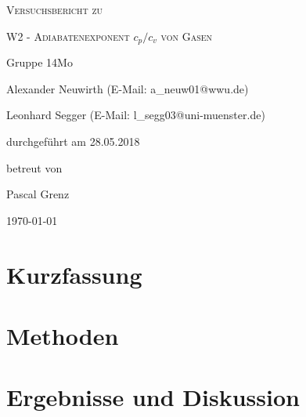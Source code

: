 \documentclass[
	a4paper,
	12pt,
	pagesize,
	ngerman
]{scrartcl}
\begin{document}
	
	\begin{titlepage}
		\centering
		{\scshape\LARGE Versuchsbericht zu \par}
		\vspace{1cm}
		{\scshape\huge W2 - Adiabatenexponent $c_p/c_v$ von Gasen \par} %
		\vspace{2.5cm}
		{\LARGE Gruppe 14Mo \par}
		\vspace{0.5cm}
		
		{\large Alexander Neuwirth (E-Mail: a\_neuw01@wwu.de) \par}
		{\large Leonhard Segger (E-Mail: l\_segg03@uni-muenster.de) \par}
		\vfill
		
		durchgeführt am 28.05.2018\par
		betreut von\par
		{\large Pascal Grenz}
		
		\vfill
		
		{\large \today\par}
	\end{titlepage}
	\tableofcontents
	\newpage


	\section{Kurzfassung}
	
	\section{Methoden} \label{sec_Methoden}
	
	\section{Ergebnisse und Diskussion}
	

\end{document}

